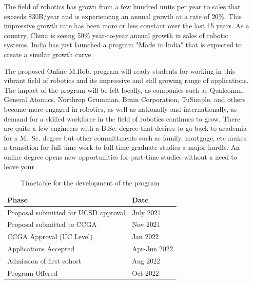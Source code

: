 \documentclass[11pt,letterpaper]{article}
\begin{document}
The field of robotics has grown from a few hundred units per year to
sales that exceeds \$30B/year and is experiencing an annual growth at a
rate of 20\%. This impressive growth rate has been more or less
constant over the last 15 years. As a country, China is seeing 50\%
year-to-year annual growth in sales of robotic systems. India has just
launched a program "Made in India" that is expected to create a similar
growth curve.

The proposed Online M.Rob. program will ready students for working in
this vibrant field of robotics and its impressive and still growing
range of applications. The impact of the program will be felt locally,
as companies such as Qualcomm, General Atomics, Northrop Grumman,
Brain Corporation, TuSimple, and others become more engaged in
robotics, as well as nationally and internationally, as demand for a
skilled workforce in the field of robotics continues to grow. There
are quite a few engineers with a B.Sc. degree that desires to go back
to academia for a M.~Sc. degree but other committments such as family,
mortgage, etc makes a transition for full-time work to full-time
graduate studies a major hurdle. An online degree opens new
opportunities for part-time studies without a need to leave your

\begin{table}[hbtp]
  \centering
  \begin{tabularx}{1.0\linewidth}[c]{ll}
    \hline
    Phase                                & Date         \\
    \hline\hline
    Proposal submitted for UCSD approval & July 2021    \\
    Proposal submitted to CCGA           & Nov 2021     \\
    CCGA Approval (UC Level)             & Jan 2022     \\
    Applications Accepted                & Apr-Jun 2022 \\
    Admission of first cohort            & Aug 2022     \\
    Program Offered                      & Oct 2022     \\
    \hline
  \end{tabularx}
  \caption{Timetable for the development of the program}
  \label{tab:timeline}
\end{table}
\end{document}
